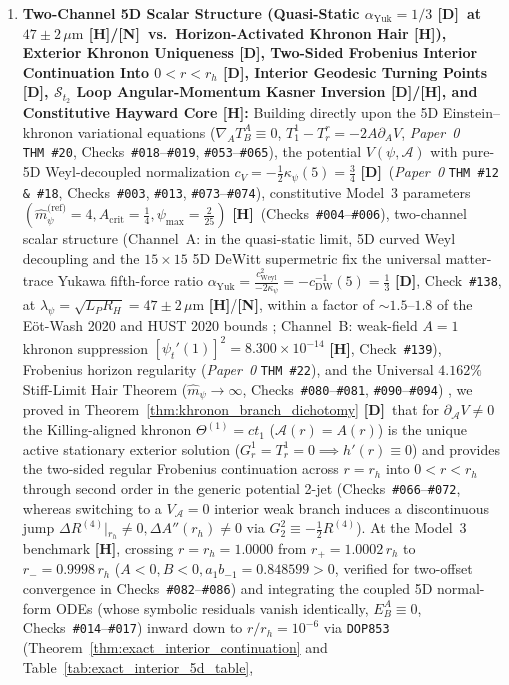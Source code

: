 \documentclass[11pt,a4paper]{article}
\newcommand{\catD}{\textbf{\textcolor{blue!75!black}{[D]}}}
\newcommand{\catH}{\textbf{\textcolor{orange!85!black}{[H]}}}
\newcommand{\catN}{\textbf{\textcolor{teal!75!black}{[N]}}}
\theoremstyle{plain}
\theoremstyle{definition}
\theoremstyle{remark}
\numberwithin{equation}{section}
\begin{document}
\begin{enumerate}
    \item \textbf{Two-Channel 5D Scalar Structure (Quasi-Static $\alpha_{\text{Yuk}} = 1/3$ \catD\ at $47 \pm 2\,\mu\text{m}$ \catH/\catN\ vs.\ Horizon-Activated Khronon Hair \catH), Exterior Khronon Uniqueness \catD, Two-Sided Frobenius Interior Continuation Into $0 < r < r_h$ \catD, Interior Geodesic Turning Points \catD, $\mathcal{S}_{t_2}$ Loop Angular-Momentum Kasner Inversion \catD/\catH, and Constitutive Hayward Core \catH:} Building directly upon the 5D Einstein--khronon variational equations ($\nabla_A T^A_B \equiv 0$, $T^1_1 - T^r_r = -2A\partial_A V$, \textit{Paper~0} \texttt{THM~\#20}, Checks~\texttt{\#018}--\texttt{\#019}, \texttt{\#053}--\texttt{\#065}), the potential $V(\psi,\mathcal{A})$ with pure-5D Weyl-decoupled normalization $c_V = -\frac{1}{2}\kappa_{\psi}(5) = \frac{3}{4}$ \catD\ (\textit{Paper~0} \texttt{THM~\#12 \& \#18}, Checks~\texttt{\#003}, \texttt{\#013}, \texttt{\#073}--\texttt{\#074}), constitutive Model~3 parameters $(\hat{m}_{\psi}^{\text{(ref)}}=4, A_{\text{crit}}=\frac{1}{4}, \psi_{\max}=\frac{2}{25})$ \catH\ (Checks~\texttt{\#004}--\texttt{\#006}), two-channel scalar structure (Channel~A: in the quasi-static limit, 5D curved Weyl decoupling and the $15\times 15$ 5D DeWitt supermetric fix the universal matter-trace Yukawa fifth-force ratio $\alpha_{\text{Yuk}} = \frac{c_{\text{Weyl}}^2}{-2\kappa_{\psi}} = -c_{\text{DW}}^{-1}(5) = \frac{1}{3}$ \catD, Check~\texttt{\#138}, at $\lambda_{\psi} = \sqrt{L_P R_H} = 47 \pm 2\,\mu\text{m}$ \catH/\catN, within a factor of $\sim 1.5\text{--}1.8$ of the E\"ot-Wash 2020 and HUST 2020 bounds \cite{lee2020_eotwash,tan2020_hust}; Channel~B: weak-field $A=1$ khronon suppression $[\psi_t'(1)]^2 = 8.300 \times 10^{-14}$ \catH, Check~\texttt{\#139}), Frobenius horizon regularity (\textit{Paper~0} \texttt{THM~\#22}), and the Universal $4.162\%$ Stiff-Limit Hair Theorem ($\hat{m}_{\psi} \to \infty$, Checks~\texttt{\#080}--\texttt{\#081}, \texttt{\#090}--\texttt{\#094}) \cite{jimenez2026_p0,jimenez2026a}, we proved in Theorem~\ref{thm:khronon_branch_dichotomy} \catD\ that for $\partial_{\mathcal{A}}V \neq 0$ the Killing-aligned khronon $\Theta^{(1)} = ct_1$ ($\mathcal{A}(r) = A(r)$) is the unique active stationary exterior solution ($G^1_r = T^1_r = 0 \implies h'(r) \equiv 0$) and provides the two-sided regular Frobenius continuation across $r = r_h$ into $0 < r < r_h$ through second order in the generic potential 2-jet (Checks~\texttt{\#066}--\texttt{\#072}, whereas switching to a $V_{\mathcal{A}} = 0$ interior weak branch induces a discontinuous jump $\Delta R^{(4)}\vert{}_{r_h} \neq 0, \Delta A''(r_h) \neq 0$ via $G^2_2 \equiv -\frac{1}{2}R^{(4)}$). At the Model~3 benchmark \catH, crossing $r = r_h = 1.0000$ from $r_+ = 1.0002\,r_h$ to $r_- = 0.9998\,r_h$ ($A < 0, B < 0, a_1 b_{-1} = 0.848599 > 0$, verified for two-offset convergence in Checks~\texttt{\#082}--\texttt{\#086}) and integrating the coupled 5D normal-form ODEs (whose symbolic residuals vanish identically, $E^A_B \equiv 0$, Checks~\texttt{\#014}--\texttt{\#017}) inward down to $r/r_h = 10^{-6}$ via \texttt{DOP853} (Theorem~\ref{thm:exact_interior_continuation} and Table~\ref{tab:exact_interior_5d_table}, 
\end{enumerate}
\end{document}
